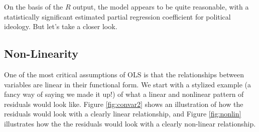 \documentclass[11pt,openany]{book}
\begin{document}
On the basis of the $R$ output, the model appears to be quite reasonable, with a statistically significant estimated partial regression coefficient for political ideology. But let's take a closer look.

\subsection{Non-Linearity} 

One of the most critical assumptions of OLS is that the relationships between variables are linear in their functional form. We start with a stylized example (a fancy way of saying we made it up!) of what a linear and nonlinear pattern of residuals would look like. Figure \ref{fig:convar2} shows an illustration of how the residuals would look with a clearly linear relationship, and Figure \ref{fig:nonlin} illustrates how the the residuals would look with a clearly non-linear relationship.  
\end{document}
